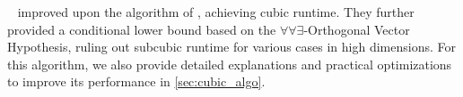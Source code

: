 \citeauthor{polyline_simplification_has_cubic_complexity_bringmannetal}~\cite{polyline_simplification_has_cubic_complexity_bringmannetal} improved upon the algorithm of \citeauthor{on_optimal_polyline_simplification_using_the_hausdorff_and_frechet_distance}, achieving cubic runtime. They further provided a conditional lower bound based on the \(\forall\forall\exists\)-Orthogonal Vector Hypothesis, ruling out subcubic runtime for various cases in high dimensions. For this algorithm, we also provide detailed explanations and practical optimizations to improve its performance in \cref{sec:cubic_algo}.

